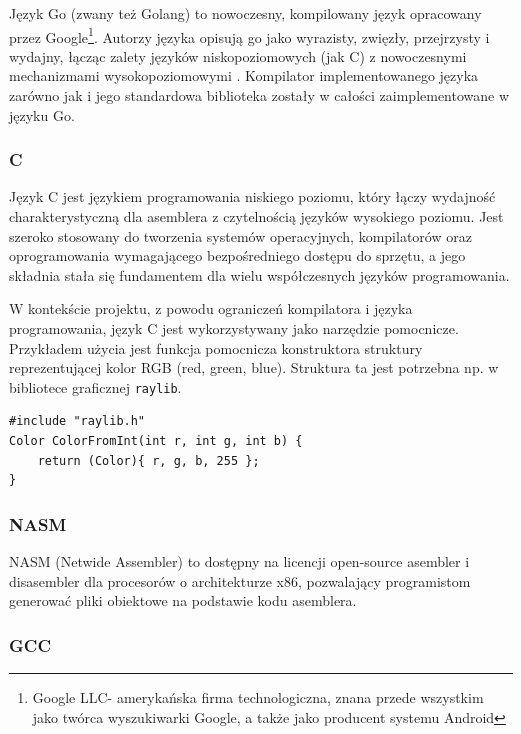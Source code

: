 Język Go (zwany też Golang) to nowoczesny, kompilowany język opracowany przez Google\footnote{Google LLC- amerykańska firma technologiczna, znana przede wszystkim jako twórca wyszukiwarki Google, a także jako producent systemu Android}. Autorzy języka opisują go jako wyrazisty, zwięzły, przejrzysty i wydajny, łącząc zalety języków niskopoziomowych (jak C) z nowoczesnymi mechanizmami wysokopoziomowymi \cite{bib:go-docs}. Kompilator implementowanego języka zarówno jak i jego standardowa biblioteka zostały w całości zaimplementowane w języku Go.

\subsubsection{C}

Język C \cite{bib:c} jest językiem programowania niskiego poziomu, który łączy wydajność charakterystyczną dla asemblera z czytelnością języków wysokiego poziomu. Jest szeroko stosowany do tworzenia systemów operacyjnych, kompilatorów oraz oprogramowania wymagającego bezpośredniego dostępu do sprzętu, a jego składnia stała się fundamentem dla wielu współczesnych języków programowania.

W kontekście projektu, z powodu ograniczeń kompilatora i języka programowania, język C jest wykorzystywany jako narzędzie pomocnicze. Przykładem użycia jest funkcja pomocnicza konstruktora struktury reprezentującej kolor RGB (red, green, blue). Struktura ta jest potrzebna np. w bibliotece graficznej \verb|raylib|.

\begin{lstlisting}[caption={Funkcja pomocnicza w C}, label={lst:c-color}]
#include "raylib.h"
Color ColorFromInt(int r, int g, int b) {
    return (Color){ r, g, b, 255 };
}
\end{lstlisting}

\subsubsection{NASM}

NASM (Netwide Assembler) to dostępny na licencji open-source asembler i disasembler dla procesorów o architekturze x86, pozwalający programistom generować pliki obiektowe na podstawie kodu asemblera. 


\subsubsection{GCC} %

